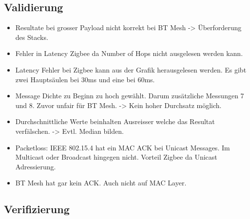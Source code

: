 \subsection{Validierung}\label{subsec:Validierung}




\begin{itemize}
\item Resultate bei grosser Payload nicht korrekt bei BT Mesh -> Überforderung des Stacks.

\item Fehler in Latency Zigbee da Number of Hops nicht ausgelesen werden kann.

\item Latency Fehler bei Zigbee kann aus der Grafik herausgelesen werden. Es gibt zwei Hauptsäulen bei 30ms und eine bei 60ms.

\item Message Dichte zu Beginn zu hoch gewählt. Darum zusätzliche Messungen 7 und 8. Zuvor unfair für BT Mesh. -> Kein hoher Durchsatz möglich.

\item Durchschnittliche Werte beinhalten Ausreisser welche das Resultat verfälschen. -> Evtl. Median bilden.

\item Packetloss: IEEE 802.15.4 hat ein MAC ACK bei Unicast Messages. Im Multicast oder Broadcast hingegen nicht. Vorteil Zigbee da Unicast Adressierung.

\item BT Mesh hat gar kein ACK. Auch nicht auf MAC Layer.

\end{itemize}

\subsection{Verifizierung}\label{subsec:Verifizierung}





